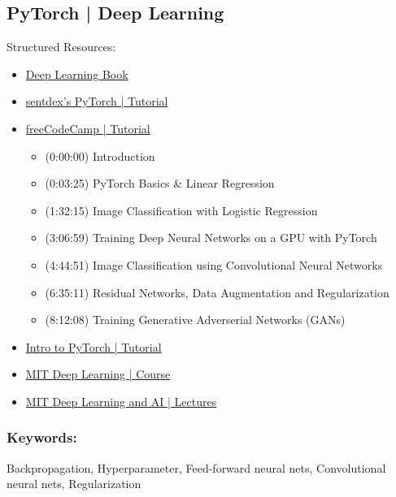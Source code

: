 \subsection{PyTorch | Deep Learning}
Structured Resources:
\begin{itemize}
	\item
	\href{http://www.deeplearningbook.org/}{Deep Learning Book}

	\item
	\href{https://www.youtube.com/results?search_query=sentdex+pytorch+pt.+3}{sentdex's PyTorch | Tutorial}

	\item
	\href{https://youtu.be/GIsg-ZUy0MY}{freeCodeCamp | Tutorial}
	\begin{itemize}
		\item (0:00:00) Introduction
		\item (0:03:25) PyTorch Basics \& Linear Regression
		\item (1:32:15) Image Classification with Logistic Regression
		\item (3:06:59) Training Deep Neural Networks on a GPU with PyTorch
		\item (4:44:51) Image Classification using Convolutional Neural Networks
		\item (6:35:11) Residual Networks, Data Augmentation and Regularization
		\item (8:12:08) Training Generative Adverserial Networks (GANs)
	\end{itemize}

	\item
	\href{https://youtu.be/pWrwyOsho5A}{Intro to PyTorch | Tutorial}

	\item
	\href{http://introtodeeplearning.com/}{MIT Deep Learning | Course}

	\item
	\href{https://deeplearning.mit.edu/}{MIT Deep Learning and AI | Lectures}

\end{itemize}

\subsubsection*{Keywords:} Backpropagation, Hyperparameter, Feed-forward neural nets, Convolutional neural nets, Regularization

